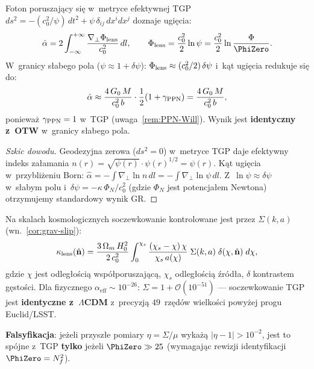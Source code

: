\begin{proposition}%
\label{prop:deflection-angle}
Foton poruszaj\k{a}cy si\k{e} w~metryce efektywnej TGP
$ds^2 = -(c_0^2/\psi)\,dt^2 + \psi\,\delta_{ij}\,dx^i dx^j$
doznaje ugi\k{e}cia:
\begin{equation}\label{eq:deflection-TGP}
  \hat\alpha = 2\int_{-\infty}^{+\infty}
  \frac{\nabla_\perp \Phi_{\rm lens}}{c_0^2}\,dl,
  \qquad
  \Phi_{\rm lens} = \frac{c_0^2}{2}\ln\psi = \frac{c_0^2}{2}\ln\frac{\Phi}{\PhiZero}.
\end{equation}
W~granicy s\l{}abego pola ($\psi \approx 1 + \delta\psi$):
$\Phi_{\rm lens} \approx (c_0^2/2)\,\delta\psi$ i~k\k{a}t ugi\k{e}cia
redukuje si\k{e} do:
\begin{equation}\label{eq:deflection-weak}
  \hat\alpha \approx \frac{4\,G_0\,M}{c_0^2\,b}
  \cdot \frac{1}{2}(1 + \gamma_{\rm PPN}) = \frac{4\,G_0\,M}{c_0^2\,b},
\end{equation}
poniewa\.z $\gamma_{\rm PPN} = 1$ w~TGP (uwaga~\ref{rem:PPN-Will}).
Wynik jest \textbf{identyczny z~OTW} w~granicy s\l{}abego pola.
\end{proposition}

\begin{proof}[Szkic dowodu]
Geodezyjna zerowa ($ds^2 = 0$) w~metryce TGP daje
efektywny indeks za\l{}amania $n(r) = \sqrt{\psi(r)} \cdot \psi(r)^{1/2}
= \psi(r)$.
K\k{a}t ugi\k{e}cia w~przybli\.zeniu Born:
$\hat\alpha = -\int \nabla_\perp \ln n\,dl = -\int \nabla_\perp \ln\psi\,dl$.
Z~$\ln\psi \approx \delta\psi$ w~s\l{}abym polu
i~$\delta\psi = -\kappa\,\Phi_N/c_0^2$
(gdzie $\Phi_N$ jest potencja\l{}em Newtona)
otrzymujemy standardowy wynik GR.
\end{proof}

\begin{corollary}%
\label{cor:lensing-potential}
Na skalach kosmologicznych soczewkowanie kontrolowane jest przez
$\Sigma(k,a)$ (wn.~\ref{cor:grav-slip}):
\begin{equation}\label{eq:lensing-convergence}
  \kappa_{\rm lens}(\hat{\mathbf{n}})
  = \frac{3\,\Omega_m\,H_0^2}{2\,c_0^2}\int_0^{\chi_s}
  \frac{(\chi_s - \chi)\,\chi}{\chi_s\,a(\chi)}\;\Sigma(k,a)\;\delta(\chi,\hat{\mathbf{n}})\;d\chi,
\end{equation}
gdzie $\chi$ jest odleg\l{}o\'sci\k{a} wsp\'o\l{}poruszaj\k{a}c\k{a},
$\chi_s$ odleg\l{}o\'sci\k{a} \'zr\'od\l{}a, $\delta$ kontrastem g\k{e}sto\'sci.
Dla fizycznego $\alpha_{\mathrm{eff}} \sim 10^{-26}$:
$\Sigma = 1 + \mathcal{O}(10^{-51})$
--- soczewkowanie TGP jest \textbf{identyczne z~$\Lambda$CDM}
z~precyzj\k{a} $49$~rz\k{e}d\'ow wielko\'sci powy\.zej
progu Euclid/LSST.

\textbf{Falsyfikacja}: je\.zeli przysz\l{}e pomiary $\eta = \Sigma/\mu$
wyka\.z\k{a} $|\eta - 1| > 10^{-2}$, jest to sp\'ojne z~TGP
\textbf{tylko} je\.zeli $\PhiZero \gg 25$ (wymagaj\k{a}c rewizji
identyfikacji $\PhiZero = N_f^2$).
\end{corollary}

